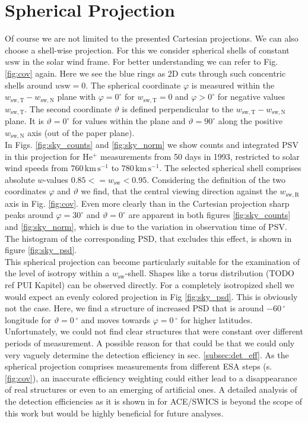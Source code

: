 \section{Spherical Projection}
Of course we are not limited to the presented Cartesian projections.
We can also choose a shell-wise projection. For this we consider spherical shells of constant $w\mathrm{sw}$ in the solar wind frame. For better understanding we can refer to Fig. \ref{fig:cov} again. Here we see the blue rings as 2D cuts through such concentric shells around $w\mathrm{sw} = 0$. The spherical coordinate $\varphi$ is measured within the $w_\mathrm{sw,T}-w_\mathrm{sw,N}$ plane with $\varphi = 0^\circ$ for $w_\mathrm{sw,T} = 0$ and $\varphi > 0^\circ$ for negative values $w_\mathrm{sw,T}$. The second coordinate $\vartheta$ is defined perpendicular to the $w_\mathrm{sw,T}-w_\mathrm{sw,N}$ plane. It is $\vartheta = 0 ^\circ$ for values within the plane and $\vartheta = 90^\circ$ along the positive $w_\mathrm{sw,N}$ axis (out of the paper plane).
\\
In Figs. \ref{fig:sky_counts} and \ref{fig:sky_norm} we show counts and integrated PSV in this projection for $\mathrm{He^{+}}$ measurements from 50 days in 1993, restricted to solar wind speeds from $760 \, \mathrm{km\,s^{-1}}$ to $780 \, \mathrm{km\,s^{-1}}$. The selected spherical shell comprises absolute $w$-values $0.85 <= w_\mathrm{sw} < 0.95$. Considering the definition of the two coordinates $\varphi$ and $\vartheta$ we find, that the central viewing direction against the $w_\mathrm{sw,R}$ axis in Fig. \ref{fig:cov}. Even more clearly than in the Cartesian projection sharp peaks around $\varphi = 30 ^\circ$ and $\vartheta = 0 ^\circ$ are apparent in both figures \ref{fig:sky_counts} and \ref{fig:sky_norm}, which is due to the variation in observation time of PSV. The histogram of the corresponding PSD, that excludes this effect, is shown in figure \ref{fig:sky_psd}.\\
This spherical projection can become particularly suitable for the examination of the level of isotropy within a $w_\mathrm{sw}$-shell. Shapes like a torus distribution (TODO ref PUI Kapitel) can be observed directly. For a completely isotropized shell we would expect an evenly colored projection in Fig \ref{fig:sky_psd}. This is obviously not the case. Here, we find a structure of increased PSD that is around $-60\,^\circ$ longitude for $\vartheta = 0\,^\circ$ and moves towards $\varphi = 0\,^\circ$ for higher latitudes.
\\
Unfortunately, we could not find clear structures that were constant over different periods of measurement. A possible reason for that could be that we could only very vaguely determine the detection efficiency in sec. \ref{subsec:det_eff}. As the spherical projection comprises measurements from different ESA steps (s. \ref{fig:cov}), an inaccurate efficiency weighting could either lead to a disappearance of real structures or even to an emerging of artificial ones. A detailed analysis of the detection efficiencies as it is shown in \citet{koeten} for ACE/SWICS is beyond the scope of this work but would be highly beneficial for future analyses.
